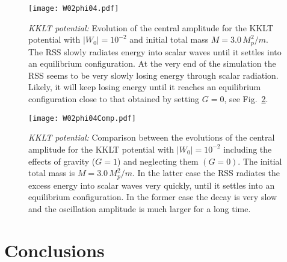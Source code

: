 \documentclass[11pt,a4paper]{article}
\begin{document}
\begin{figure}[h!]
    \begin{center}
    \texttt{[image: W02phi04.pdf]}
    \end{center}
    \caption{{\it KKLT potential: } Evolution of the central amplitude for the KKLT potential with $|W_0| = 10^{-2}$ and initial total mass $M = 3.0 \, M_p^2/m$. The RSS slowly radiates energy into scalar waves until it settles into an equilibrium configuration. At the very end of the simulation the RSS seems to be very slowly losing energy through scalar radiation. Likely, it will keep losing energy until it reaches an equilibrium configuration close to that obtained by setting $G = 0$, see Fig.~\ref{fig:phiW02phi04Comp}.}
\label{fig:phiW02phi04}
\end{figure}

\begin{figure}[h!]
    \centering
    \texttt{[image: W02phi04Comp.pdf]}
    \caption{{\it KKLT potential: }Comparison between the evolutions of the central amplitude for the KKLT potential with $|W_0| = 10^{-2}$ including the effects of gravity ($G = 1$) and neglecting them $(G = 0)$. The initial total mass is $M = 3.0 \, M_p^2/m$. In the latter case the RSS radiates the excess energy into scalar waves very quickly, until it settles into an equilibrium configuration. In the former case the decay is very slow and the oscillation amplitude is much larger for a long time.}
\label{fig:phiW02phi04Comp}
\end{figure}

\section{Conclusions}
\label{sec:Conclusions}
\end{document}
